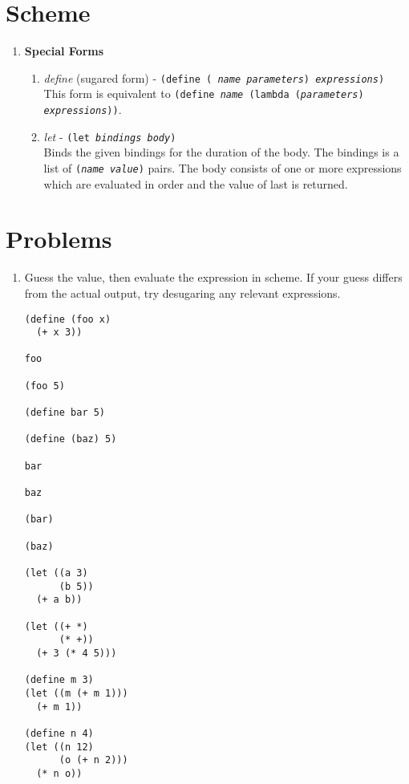 


\section*{Scheme}

\begin{enumerate}
\item {\bf Special Forms}
  \begin{enumerate}
  \item {\large {\it define} (sugared form)} - {\tt (define ({\it
    name parameters}) {\it expressions})}\\ This form is equivalent to
    {\tt (define {\it name} (lambda ({\it parameters}) {\it
    expressions}))}.
    \vspace{.5in}
  \item {\large {\it let}} - {\tt (let {\it bindings body})}\\ Binds the
    given bindings for the duration of the body.  The bindings is a
    list of {\tt ({\it name value})} pairs.  The body consists of one
    or more expressions which are evaluated in order and the value of
    last is returned.
    \vspace{1in}
  \end{enumerate}
\end{enumerate}

\section*{Problems}

\begin{enumerate}
\item Guess the value, then evaluate the expression in scheme.  If
your guess differs from the actual output, try desugaring any relevant
expressions.

\begin{verbatim}
(define (foo x)
  (+ x 3))

foo

(foo 5)

(define bar 5)

(define (baz) 5)

bar

baz

(bar)

(baz)

(let ((a 3)
      (b 5))
  (+ a b))

(let ((+ *)
      (* +))
  (+ 3 (* 4 5)))

(define m 3)
(let ((m (+ m 1)))
  (+ m 1))

(define n 4)
(let ((n 12)
      (o (+ n 2)))
  (* n o))

\end{verbatim}

\end{enumerate}

